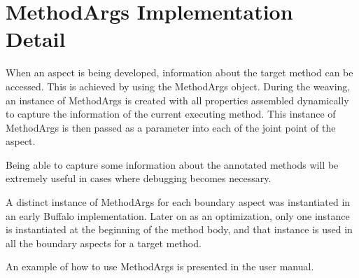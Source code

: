 \section{MethodArgs Implementation Detail}

When an aspect is being developed, information about the target method can be accessed. This is achieved by using the MethodArgs object. During the weaving, an instance of MethodArgs is created with all properties assembled dynamically to capture the information of the current executing method. This instance of MethodArgs is then passed as a parameter into each of the joint point of the aspect.

Being able to capture some information about the annotated methods will be  extremely useful in cases where debugging becomes necessary.

A distinct instance of MethodArgs for each boundary aspect was instantiated in an early Buffalo implementation. Later on as an optimization, only one instance is instantiated at the beginning of the method body, and that instance is used in all the boundary aspects for a target method.

An example of how to use MethodArgs is presented in the user manual.
